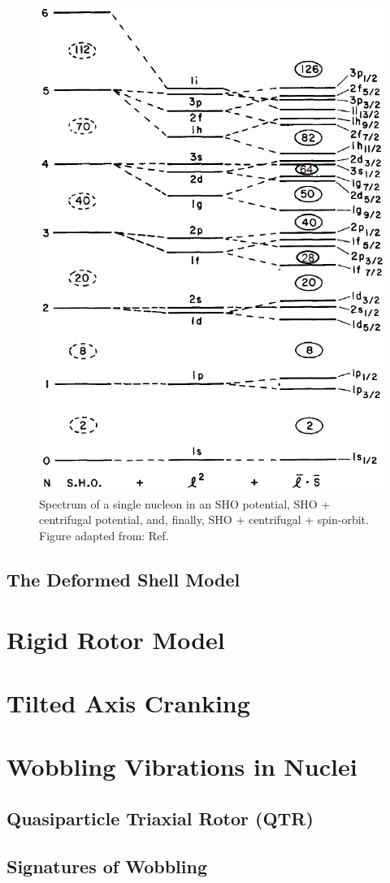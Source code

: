\begin{figure}[h!]
\label{fig:chp2-shell-model}
\centerline{\includegraphics[height=0.8\textheight]{./img/c2/shell_model.png}}
	\caption{Spectrum of a single nucleon in an SHO potential, SHO + centrifugal potential, and, finally, SHO + centrifugal + spin-orbit. Figure adapted from: Ref.\cite{casten}}
\end{figure}

\subsection{The Deformed Shell Model}
\label{ssec:models-shell-model-def-sm}
\section{Rigid Rotor Model}
\label{sec:models-rigid-rotor}

\section{Tilted Axis Cranking}
\label{sec:models-tac}

\section{Wobbling Vibrations in Nuclei}
\label{sec:models-wobbling}
\subsection{Quasiparticle Triaxial Rotor (QTR)}
\label{sec:models-qtr}
\subsection{Signatures of Wobbling}
\label{sec:models-sig}
